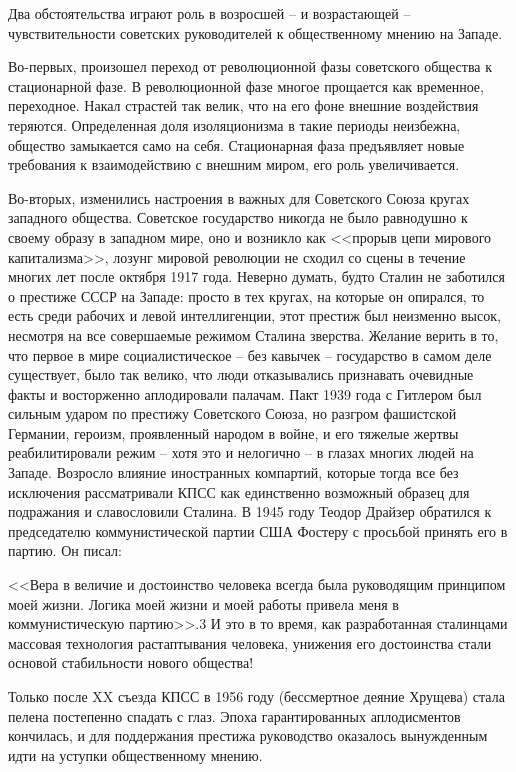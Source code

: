 \documentclass{book}
\begin{document}
Два обстоятельства играют роль в возросшей -- и возрас­тающей -- чувствительности советских руководителей к общест­венному мнению на Западе.

Во-первых, произошел переход от революционной фазы советского общества к стационарной фазе. В революционной фазе многое прощается как временное, переходное. Накал страстей так велик, что на его фоне внешние воздействия теря­ются. Определенная доля изоляционизма в такие периоды неизбежна, общество замыкается само на себя. Стационарная фаза предъявляет новые требования к взаимодействию с внеш­ним миром, его роль увеличивается.

Во-вторых, изменились настроения в важных для Советско­го Союза кругах западного общества. Советское государство никогда не было равнодушно к своему образу в западном ми­ре, оно и возникло как <<прорыв цепи мирового капитализма>>, лозунг мировой революции не сходил со сцены в течение многих лет после октября 1917 года. Неверно думать, будто Сталин не заботился о престиже СССР на Западе: просто в тех кругах, на которые он опирался, то есть среди рабочих и левой интел­лигенции, этот престиж был неизменно высок, несмотря на все совершаемые режимом Сталина зверства. Желание верить в то, что первое в мире социалистическое -- без кавычек -- го­сударство в самом деле существует, было так велико, что люди отказывались признавать очевидные факты и восторженно аплодировали палачам. Пакт 1939 года с Гитлером был силь­ным ударом по престижу Советского Союза, но разгром фа­шистской Германии, героизм, проявленный народом в войне, и его тяжелые жертвы реабилитировали режим -- хотя это и нелогично -- в глазах многих людей 
на 
Западе. Возросло вли­яние иностранных компартий, которые тогда все без исключения рассматривали КПСС как единственно возможный образец для подражания и славословили Сталина. В 1945 году Теодор Драйзер обратился к председателю коммунистической партии США Фостеру с просьбой принять его в партию. Он писал:

<<Вера в величие и достоинство человека всегда была руководящим принципом моей жизни. Логика моей жизни и моей работы привела меня в коммунистическую партию>>.3 И это в то время, как разработанная сталинцами массовая технология растаптывания человека, унижения его достоинства стали основой стабильности нового общества!

Только после XX съезда КПСС в 1956 году (бессмертное деяние Хрущева) стала пелена постепенно спадать с глаз. Эпо­ха гарантированных аплодисментов кончилась, и для поддер­жания престижа руководство оказалось вынужденным идти на уступки общественному мнению.
\end{document}
